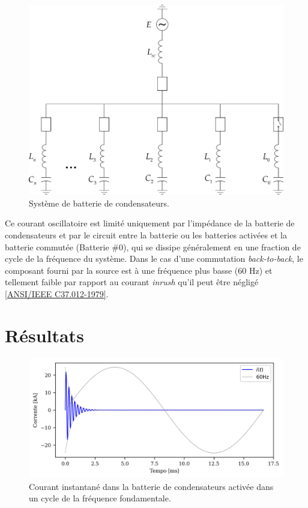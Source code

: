 \documentclass[a4paper]{article}
\begin{document}
	\begin{figure}[!hbp]
		\centering
		\includegraphics{Picture1.png}
		\caption{Système de batterie de condensateurs.}
		\label{fig:picture1}
	\end{figure}
	
	Ce courant oscillatoire est limité uniquement par l'impédance de la batterie de condensateurs et par le circuit entre la batterie ou les batteries activées et la batterie commutée (Batterie \#0), qui se dissipe généralement en une fraction de cycle de la fréquence du système. Dans le cas d'une commutation \textit{back-to-back}, le composant fourni par la source est à une fréquence plus basse (60 Hz) et tellement faible par rapport au courant \textit{inrush} qu'il peut être négligé \href{https://ieeexplore.ieee.org/document/7035261}{[ANSI/IEEE C37.012-1979]}.
	
	\section{Résultats}
	\begin{figure}[!hbp]
		\centering
		\includegraphics{Correntes.png}
		\caption{Courant instantané dans la batterie de condensateurs activée dans un cycle de la fréquence fondamentale.}
		\label{fig:picture2}
	\end{figure}
	
\end{document}
